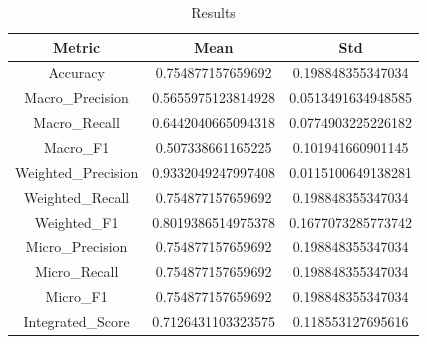 \begin{table}[htbp]
\centering
\caption{Results}
\label{tab:csv}
\small
\setlength{\tabcolsep}{4pt}
\begin{tabular}{|c|c|c|}
\hline
Metric & Mean & Std \\
\hline
Accuracy & 0.754877157659692 & 0.198848355347034 \\
Macro_Precision & 0.5655975123814928 & 0.0513491634948585 \\
Macro_Recall & 0.6442040665094318 & 0.0774903225226182 \\
Macro_F1 & 0.507338661165225 & 0.101941660901145 \\
Weighted_Precision & 0.9332049247997408 & 0.0115100649138281 \\
Weighted_Recall & 0.754877157659692 & 0.198848355347034 \\
Weighted_F1 & 0.8019386514975378 & 0.1677073285773742 \\
Micro_Precision & 0.754877157659692 & 0.198848355347034 \\
Micro_Recall & 0.754877157659692 & 0.198848355347034 \\
Micro_F1 & 0.754877157659692 & 0.198848355347034 \\
Integrated_Score & 0.7126431103323575 & 0.118553127695616 \\
\hline
\end{tabular}
\end{table}